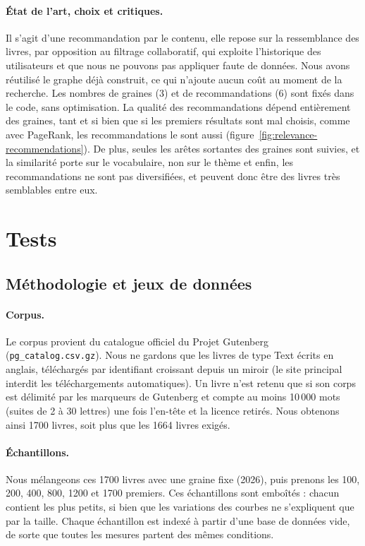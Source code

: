 \documentclass[11pt,a4paper]{article}
\begin{document}
\paragraph{État de l'art, choix et critiques.}
Il s'agit d'une recommandation par le contenu, elle repose sur la ressemblance des livres, par opposition au filtrage collaboratif, qui exploite l'historique des utilisateurs et que nous ne pouvons pas appliquer faute de données. Nous avons réutilisé le graphe déjà construit, ce qui n'ajoute aucun coût au moment de la recherche. Les nombres de graines (3) et de recommandations (6) sont fixés dans le code, sans optimisation. La qualité des recommandations dépend entièrement des graines, tant et si bien que si les premiers résultats sont mal choisis, comme avec PageRank, les recommandations le sont aussi (figure~\ref{fig:relevance-recommendations}). De plus, seules les arêtes sortantes des graines sont suivies, et la similarité porte sur le vocabulaire, non sur le thème et enfin, les recommandations ne sont pas diversifiées, et peuvent donc être des livres très semblables entre eux.


\section{Tests}

\subsection{Méthodologie et jeux de données}
\paragraph{Corpus.}
Le corpus provient du catalogue officiel du Projet Gutenberg (\texttt{pg\_catalog.csv.gz}). Nous ne gardons que les livres de type Text écrits en anglais, téléchargés par identifiant croissant depuis un miroir (le site principal interdit les téléchargements automatiques). Un livre n'est retenu que si son corps est délimité par les marqueurs de Gutenberg et compte au moins 10\,000 mots (suites de 2 à 30 lettres) une fois l'en-tête et la licence retirés. Nous obtenons ainsi 1700 livres, soit plus que les 1664 livres exigés.

\paragraph{Échantillons.}
Nous mélangeons ces 1700 livres avec une graine fixe (2026), puis prenons les 100, 200, 400, 800, 1200 et 1700 premiers. Ces échantillons sont emboîtés : chacun contient les plus petits, si bien que les variations des courbes ne s'expliquent que par la taille. Chaque échantillon est indexé à partir d'une base de données vide, de sorte que toutes les mesures partent des mêmes conditions.
\end{document}
